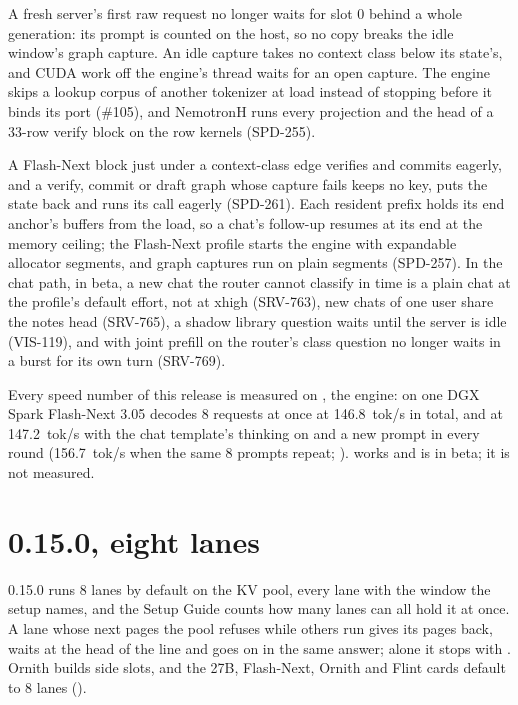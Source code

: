 A fresh server's first raw request no longer waits for slot 0 behind a whole generation: its prompt is counted on the host, so no copy breaks the idle window's graph capture. An idle capture takes no context class below its state's, and CUDA work off the engine's thread waits for an open capture. The engine skips a lookup corpus of another tokenizer at load instead of stopping before it binds its port (\#105), and NemotronH runs every projection and the head of a 33-row verify block on the row kernels (SPD-255).

A Flash-Next block just under a context-class edge verifies and commits eagerly, and a verify, commit or draft graph whose capture fails keeps no key, puts the state back and runs its call eagerly (SPD-261). Each resident prefix holds its end anchor's buffers from the load, so a chat's follow-up resumes at its end at the memory ceiling; the Flash-Next profile starts the engine with expandable allocator segments, and graph captures run on plain segments (SPD-257). In the chat path, in beta, a new chat the router cannot classify in time is a plain chat at the profile's default effort, not  at xhigh (SRV-763), new chats of one user share the notes head (SRV-765), a shadow library question waits until the server is idle (VIS-119), and with joint prefill on the router's class question no longer waits in a burst for its own turn (SRV-769).

Every speed number of this release is measured on , the engine: on one DGX Spark Flash-Next 3.05 decodes 8 requests at once at 146.8~tok/s in total, and at 147.2~tok/s with the chat template's thinking on and a new prompt in every round (156.7~tok/s when the same 8 prompts repeat; \measured).  works and is in beta; it is not measured.

\section{0.15.0, eight lanes}\label{sec:changelog-0150}

0.15.0 runs 8 lanes by default on the KV pool, every lane with the window the setup names, and the Setup Guide counts how many lanes can all hold it at once. A lane whose next pages the pool refuses while others run gives its pages back, waits at the head of the line and goes on in the same answer; alone it stops with . Ornith builds side slots, and the 27B, Flash-Next, Ornith and Flint cards default to 8 lanes (\measured).

